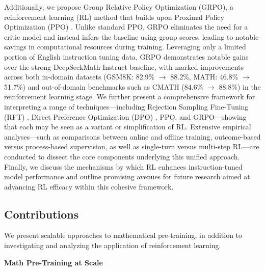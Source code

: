 Additionally, we propose Group Relative Policy Optimization (GRPO), a reinforcement learning (RL) method that builds upon Proximal Policy Optimization (PPO) \citep{schulman2017proximal}. Unlike standard PPO, GRPO eliminates the need for a critic model and instead infers the baseline using group scores, leading to notable savings in computational resources during training. Leveraging only a limited portion of English instruction tuning data, GRPO demonstrates notable gains over the strong DeepSeekMath-Instruct baseline, with marked improvements across both in-domain datasets (GSM8K: 82.9\% $\rightarrow$ 88.2\%, MATH: 46.8\% $\rightarrow$ 51.7\%) and out-of-domain benchmarks such as CMATH (84.6\% $\rightarrow$ 88.8\%) in the reinforcement learning stage. We further present a comprehensive framework for interpreting a range of techniques—including Rejection Sampling Fine-Tuning (RFT) \citep{yuan2023scaling}, Direct Preference Optimization (DPO) \citep{dpo}, PPO, and GRPO—showing that each may be seen as a variant or simplification of RL. Extensive empirical analyses—such as comparisons between online and offline training, outcome-based versus process-based supervision, as well as single-turn versus multi-step RL—are conducted to dissect the core components underlying this unified approach. Finally, we discuss the mechanisms by which RL enhances instruction-tuned model performance and outline promising avenues for future research aimed at advancing RL efficacy within this cohesive framework.

\subsection{Contributions}
We present scalable approaches to mathematical pre-training, in addition to investigating and analyzing the application of reinforcement learning.

\textbf{Math Pre-Training at Scale}

